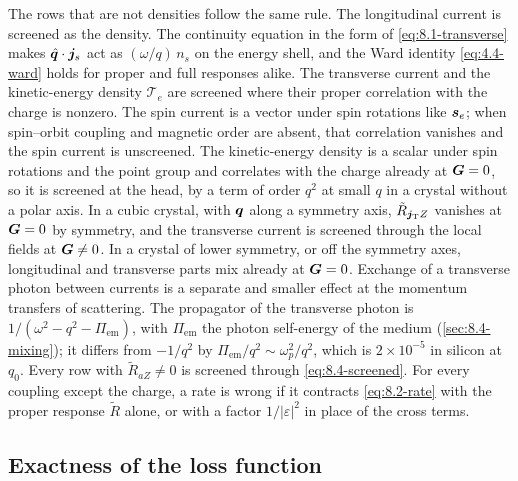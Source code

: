 The rows that are not densities follow the same rule. The longitudinal current is screened as the density. The continuity equation in the form of \cref{eq:8.1-transverse} makes $\hat{\bm{q}}\cdot\bm{j}_s$ act as $(\omega/q)\,n_s$ on the energy shell, and the Ward identity \cref{eq:4.4-ward} holds for proper and full responses alike. The transverse current and the kinetic-energy density $\mathcal{T}_e$ are screened where their proper correlation with the charge is nonzero. The spin current is a vector under spin rotations like $\bm{s}_e$; when spin--orbit coupling and magnetic order are absent, that correlation vanishes and the spin current is unscreened. The kinetic-energy density is a scalar under spin rotations and the point group and correlates with the charge already at $\bm{G} = 0$, so it is screened at the head, by a term of order $q^2$ at small $q$ in a crystal without a polar axis. In a cubic crystal, with $\bm{q}$ along a symmetry axis, $\tilde R_{\bm{j}_{\mathrm{T}}Z}$ vanishes at $\bm{G} = 0$ by symmetry, and the transverse current is screened through the local fields at $\bm{G} \ne 0$. In a crystal of lower symmetry, or off the symmetry axes, longitudinal and transverse parts mix already at $\bm{G} = 0$. Exchange of a transverse photon between currents is a separate and smaller effect at the momentum transfers of scattering. The propagator of the transverse photon is $1/(\omega^2 - q^2 - \Pi_{\mathrm{em}})$, with $\Pi_{\mathrm{em}}$ the photon self-energy of the medium (\cref{sec:8.4-mixing}); it differs from $-1/q^2$ by $\Pi_{\mathrm{em}}/q^2 \sim \omega_p^2/q^2$, which is $2\times10^{-5}$ in silicon at $q_0$. Every row with $\tilde R_{aZ} \ne 0$ is screened through \cref{eq:8.4-screened}. For every coupling except the charge, a rate is wrong if it contracts \cref{eq:8.2-rate} with the proper response $\tilde R$ alone, or with a factor $1/|\varepsilon|^2$ in place of the cross terms.

\subsection{Exactness of the loss function}\label{sec:8.4-exact}

